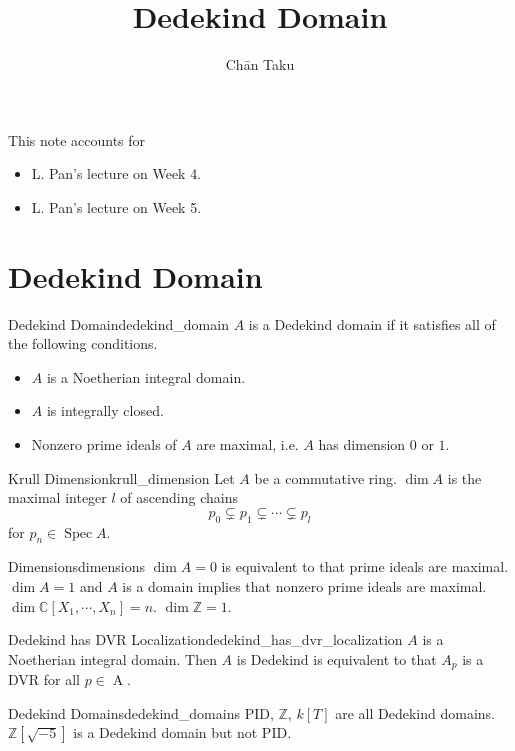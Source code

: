 \documentclass{article}
\title{Dedekind Domain}
\author{Ch\=an Taku}
\begin{document}
\maketitle

This note accounts for
\begin{itemize}
    \item L. Pan's lecture on Week 4.
    \item L. Pan's lecture on Week 5.
\end{itemize}

\section{Dedekind Domain}

\begin{definition}{Dedekind Domain}{dedekind_domain}
    $A$ is a Dedekind domain if it satisfies all of the following conditions.
    \begin{itemize}
        \item $A$ is a Noetherian integral domain.
        \item $A$ is integrally closed.
        \item Nonzero prime ideals of $A$ are maximal, i.e. $A$ has dimension $0$ or $1$.
    \end{itemize}
\end{definition}

\begin{definition}{Krull Dimension}{krull_dimension}
    Let $A$ be a commutative ring.
    $\dim A$ is the maximal integer $l$ of ascending chains
    \[ p_0 \subsetneq p_1 \subsetneq \cdots \subsetneq p_l \]
    for $p_n \in \operatorname{Spec} A$.
\end{definition}

\begin{example}{Dimensions}{dimensions}
    $\dim A = 0$ is equivalent to that prime ideals are maximal.
    $\dim A = 1$ and $A$ is a domain implies that nonzero prime ideals are maximal.
    $\dim \mathbb{C}[X_1,\cdots,X_n] = n$.
    $\dim \mathbb{Z} = 1$.
\end{example}

\begin{lemma}{Dedekind has DVR Localization}{dedekind_has_dvr_localization}
    $A$ is a Noetherian integral domain.
    Then $A$ is Dedekind is equivalent to that $A_p$ is a DVR for all $p\in \operatorname{A}$.
\end{lemma}

\begin{example}{Dedekind Domains}{dedekind_domains}
    PID, $\mathbb{Z}$, $k[T]$ are all Dedekind domains.
    $\mathbb{Z}[\sqrt{-5}]$ is a Dedekind domain but not PID.
\end{example}
\end{document}
